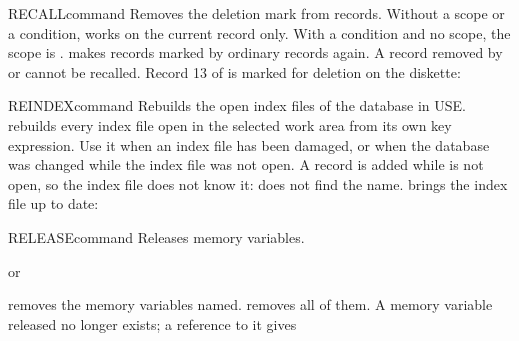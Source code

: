 \begin{XbaseEntry}{RECALL}{command}
Removes the deletion mark from records.
\Syntax
{}
\Defaults
Without a scope or a condition,  works on the current record
only.  With a  condition and no scope, the scope is .
\Usage
{} makes records marked by  ordinary records again.  A
record removed by  or  cannot be recalled.
\Examples
Record 13 of  is marked for deletion on the diskette:
\end{XbaseEntry}

\begin{XbaseEntry}{REINDEX}{command}
Rebuilds the open index files of the database in USE.
\Syntax
{}
\Usage
{} rebuilds every index file open in the selected work area from
its own key expression.  Use it when an index file has been damaged, or
when the database was changed while the index file was not open.
\Examples
A record is added while  is not open, so the index file
does not know it:  does not find the name.   brings
the index file up to date:
\end{XbaseEntry}

\begin{XbaseEntry}{RELEASE}{command}
Releases memory variables.
\Syntax
{}
\par or\par
{}
\Usage
{} removes the memory variables named.   removes all
of them.  A memory variable released no longer exists; a reference to it
gives 
\Examples
{}
\end{XbaseEntry}

